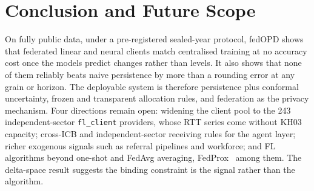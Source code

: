 \documentclass[conference]{IEEEtran}
\begin{document}
\section{Conclusion and Future Scope}
On fully public data, under a pre-registered sealed-year protocol, fedOPD shows that federated
linear and neural clients match centralised training at no accuracy cost once the models predict
changes rather than levels. It also shows that none of them reliably beats naive persistence by
more than a rounding error at any grain or horizon. The deployable system is therefore persistence
plus conformal uncertainty, frozen and transparent allocation rules, and federation as the privacy
mechanism. Four directions remain open: widening the client pool to the 243 independent-sector
\texttt{fl\_client} providers, whose RTT series come without KH03 capacity; cross-ICB and
independent-sector receiving rules for the agent layer; richer exogenous signals such as referral
pipelines and workforce; and FL algorithms beyond one-shot and FedAvg averaging, FedProx~\cite{li2020}
among them. The delta-space result suggests the binding constraint is the signal rather than the
algorithm.
\end{document}
